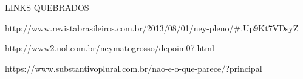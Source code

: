 LINKS QUEBRADOS

http://www.revistabrasileiros.com.br/2013/08/01/ney-pleno/#.Up9Kt7VDsyZ

http://www2.uol.com.br/neymatogrosso/depoim07.html

https://www.substantivoplural.com.br/nao-e-o-que-parece/?principal